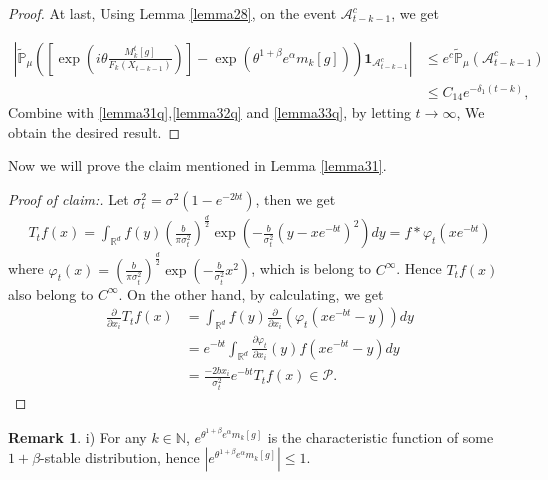\documentclass[12pt, a4paper]{amsart}
\theoremstyle{definition}
\newtheorem{rem}[thm]{Remark}
\numberwithin{equation}{section}
\begin{document}
\begin{proof}
At last, Using Lemma \ref{lemma28}, on the event $\mathcal{A}^c_{t-k-1}$, we get

\begin{align}
    \left|\mathbb{\tilde{P}}_{\mu}\left([\exp(i\theta \frac {M_k^t[g]}{F_k(X_{t-k-1})})]-\exp(\theta^{1+\beta}e^{\alpha}m_k[g])\right)\mathbf{1}_{\mathcal{A}^c_{t-k-1}}\right|&\leq e^c\mathbb{\tilde{P}}_{\mu}(\mathcal{A}^c_{t-k-1})\nonumber\\
    &\leq C_{14} e^{-\delta_1(t-k)},\label{lemma33q}
\end{align}
Combine with \eqref{lemma31q},\eqref{lemma32q} and \eqref{lemma33q}, by letting $t \rightarrow \infty$, We obtain the desired result.
\end{proof}

Now we will prove the claim mentioned in Lemma \ref{lemma31}.


\begin{proof}[Proof of claim:] Let $\sigma_t^2=\sigma^2(1-e^{-2bt})$, then we get
\begin{align*}
    T_t f(x)= \int_{\mathbb{R}^d}f(y)\left(\frac{b}{\pi \sigma_t^2}\right)^{\frac{d}{2}} \exp\left(-\frac{b}{\sigma_t^2}(y-xe^{-bt})^2\right)dy=f\ast\varphi_t(xe^{-bt})
\end{align*}
where $\varphi_t(x)=\left(\frac{b}{\pi \sigma_t^2}\right)^{\frac{d}{2}} \exp\left(-\frac{b}{\sigma_t^2}x^2\right)$, which is belong to $C^{\infty}$. Hence $  T_t f(x)$ also belong to $C^{\infty}$. On the other hand, by calculating, we get
\begin{align*}
    \frac{\partial}{\partial x_i}T_t f(x)&=\int_{\mathbb{R}^d}f(y)\frac{\partial}{\partial x_i}\left(\varphi_t(xe^{-bt}-y)\right)dy\\
    &=e^{-bt}\int_{\mathbb{R}^d}\frac{\partial \varphi_t}{\partial x_i}(y)f(xe^{-bt}-y)dy\\
    &=\frac{-2bx_i}{\sigma_t^2}e^{-bt}T_t f(x)\in \mathcal{P}.
\end{align*}
\end{proof}
\begin{rem}
   i) For any $k\in\mathbb{N}$, $e^{\theta^{1+\beta}e^{\alpha}m_k[g]}$ is the characteristic function of some $1+\beta$-stable distribution, hence $|e^{\theta^{1+\beta}e^{\alpha}m_k[g]}|\leq 1$.
\end{rem}
\end{document}
